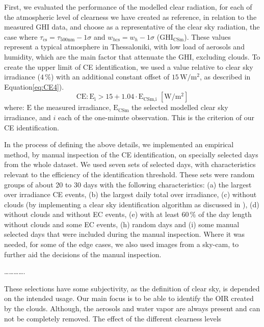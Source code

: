 \documentclass[preprint, 3p,
authoryear]{elsarticle} %
\begin{document}
First, we evaluated the performance of the modelled clear radiation, for
each of the atmospheric level of clearness we have created as reference,
in relation to the measured GHI data, and choose as a representative of
the clear sky radiation, the case where
\(\tau_{\text{cs}} = \tau_{500\text{nm}} - 1\sigma\) and
\(w_{h\text{cs}} = w_h - 1\sigma\) (\(\text{GHI}_\text{CSm}\)). These
values represent a typical atmosphere in Thessaloniki, with low load of
aerosols and humidity, which are the main factor that attenuate the GHI,
excluding clouds. To create the upper limit of CE identification, we
used a value relative to clear sky irradiance (\(4\,\%\)) with an
additional constant offset of \(15\,\text{W}/\text{m}^2\), as described
in Equation\nobreakspace\ref{eq:CE4}). \begin{equation}
\text{CE} : \text{E}_\text{i} > 15 + 1.04 \cdot \text{E}_\text{CSm,i} \,\,[\text{W}/\text{m}^2] \label{eq:CE4}
\end{equation} where: \(\text{E}\) the measured irradiance,
\(\text{E}_\text{CSm}\) the selected modelled clear sky irradiance, and
\(i\) each of the one-minute observation. This is the criterion of our
CE identification.

In the process of defining the above details, we implemented an
empirical method, by manual inspection of the CE identification, on
specially selected days from the whole dataset. We used seven sets of
selected days, with characteristics relevant to the efficiency of the
identification threshold. These sets were random groups of about 20 to
30 days with the following characteristics: (a) the largest over
irradiance CE events, (b) the largest daily total over irradiance, (c)
without clouds (by implementing a clear sky identification algorithm as
discussed in \citet{Natsis2023}), (d) without clouds and without EC
events, (e) with at least \(60\,\%\) of the day length without clouds
and some EC events, (h) random days and (i) some manual selected days
that were included during the manual inspection. Where it was needed,
for some of the edge cases, we also used images from a sky-cam, to
further aid the decisions of the manual inspection.

\ldots\ldots\ldots\ldots.

These selections have some subjectivity, as the definition of clear sky,
is depended on the intended usage. Our main focus is to be able to
identify the OIR created by the clouds. Although, the aerosols and water
vapor are always present and can not be completely removed. The effect
of the different clearness levels
\end{document}
